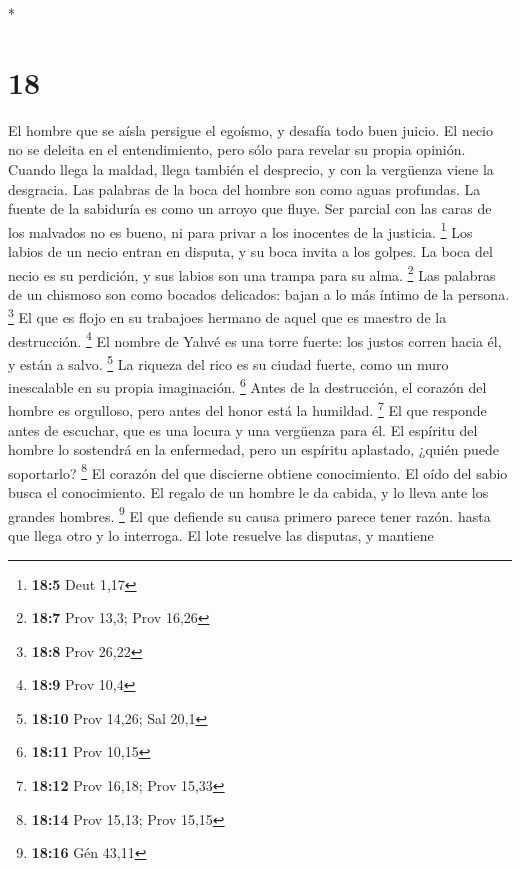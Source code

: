 \begin{paracol}{2}
\begin{otherlanguage}{english}
\end{otherlanguage}

\switchcolumn[0]*

\hypertarget{section-34}{%
\section{18}\label{section-34}}

 El hombre que se aísla persigue el egoísmo, y desafía
todo buen juicio.  El necio no se deleita en el
entendimiento, pero sólo para revelar su propia opinión. 
Cuando llega la maldad, llega también el desprecio, y con la vergüenza
viene la desgracia.  Las palabras de la boca del hombre
son como aguas profundas. La fuente de la sabiduría es como un arroyo
que fluye.  Ser parcial con las caras de los malvados no
es bueno, ni para privar a los inocentes de la justicia. \footnote{\textbf{18:5}
  Deut 1,17}  Los labios de un necio entran en disputa, y
su boca invita a los golpes.  La boca del necio es su
perdición, y sus labios son una trampa para su alma. \footnote{\textbf{18:7}
  Prov 13,3; Prov 16,26}  Las palabras de un chismoso son
como bocados delicados: bajan a lo más íntimo de la persona. \footnote{\textbf{18:8}
  Prov 26,22}  El que es flojo en su trabajoes hermano de
aquel que es maestro de la destrucción. \footnote{\textbf{18:9} Prov
  10,4}  El nombre de Yahvé es una torre fuerte: los
justos corren hacia él, y están a salvo. \footnote{\textbf{18:10} Prov
  14,26; Sal 20,1}  La riqueza del rico es su ciudad
fuerte, como un muro inescalable en su propia imaginación. \footnote{\textbf{18:11}
  Prov 10,15}  Antes de la destrucción, el corazón del
hombre es orgulloso, pero antes del honor está la humildad. \footnote{\textbf{18:12}
  Prov 16,18; Prov 15,33}  El que responde antes de
escuchar, que es una locura y una vergüenza para él.  El
espíritu del hombre lo sostendrá en la enfermedad, pero un espíritu
aplastado, ¿quién puede soportarlo? \footnote{\textbf{18:14} Prov 15,13;
  Prov 15,15}  El corazón del que discierne obtiene
conocimiento. El oído del sabio busca el conocimiento. 
El regalo de un hombre le da cabida, y lo lleva ante los grandes
hombres. \footnote{\textbf{18:16} Gén 43,11}  El que
defiende su causa primero parece tener razón. hasta que llega otro y lo
interroga.  El lote resuelve las disputas, y mantiene

\end{paracol}
